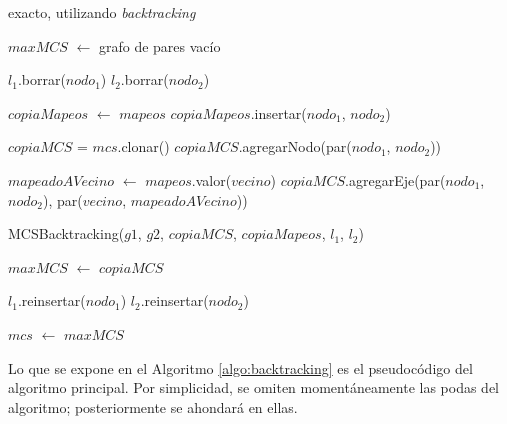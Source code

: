 \begin{algorithm}[H]
    \caption{ exacto, utilizando \emph{backtracking}}
    \label{algo:backtracking}


     {
    }

    $maxMCS$ $\gets$ grafo de pares vacío \;

     {
         {

            $l_1$.borrar($nodo_1$) \;
            $l_2$.borrar($nodo_2$) \;

            $copiaMapeos$ $\gets$ $mapeos$ \;
            $copiaMapeos$.insertar($nodo_1$, $nodo_2$) \;

            $copiaMCS$ = $mcs$.clonar() \;
            $copiaMCS$.agregarNodo(par($nodo_1$, $nodo_2$)) \;

             {
                $mapeadoAVecino$ $\gets$ $mapeos$.valor($vecino$) \;
                 {
                    $copiaMCS$.agregarEje(par($nodo_1$, $nodo_2$), par($vecino$,
                    $mapeadoAVecino$))
                }
            }

            MCSBacktracking($g1$, $g2$, $copiaMCS$, $copiaMapeos$, $l_1$, $l_2$) \;

             {
                $maxMCS$ $\gets$ $copiaMCS$ \;
            }

            $l_1$.reinsertar($nodo_1$) \;
            $l_2$.reinsertar($nodo_2$) \;
        }
    }

    $mcs$ $\gets$ $maxMCS$

\end{algorithm}

\vspace{1em}

Lo que se expone en el Algoritmo \ref{algo:backtracking} es el pseudocódigo
del algoritmo principal. Por simplicidad, se omiten momentáneamente las podas
del algoritmo; posteriormente se ahondará en ellas.

